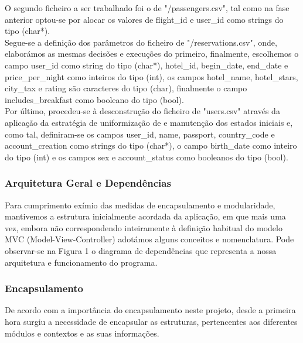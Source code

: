 \documentclass[12pt,a4paper]{article}
\begin{document}
    O segundo ficheiro a ser trabalhado foi o de "/passengers.csv", tal como na fase anterior optou-se por alocar os valores de flight\_id e user\_id como strings do tipo (char*).\\

    Segue-se a definição dos parâmetros do ficheiro de "/reservations.csv", onde, elaborámos as mesmas decisões e execuções do primeiro, finalmente, escolhemos o campo user\_id como string do tipo (char*), hotel\_id, begin\_date, end\_date e price\_per\_night como inteiros do tipo (int), os campos hotel\_name, hotel\_stars, city\_tax e rating são caracteres do tipo (char), finalmente o campo includes\_breakfast como booleano do tipo (bool).\\

    Por último, procedeu-se à desconstrução do ficheiro de "users.csv" através da aplicação da estratégia de uniformização de e manutenção dos estados iniciais e, como tal, definiram-se os campos user\_id, name, passport, country\_code e account\_creation como strings do tipo (char*), o campo birth\_date como inteiro do tipo (int) e os campos sex e account\_status como booleanos do tipo (bool).\\

    \subsubsection{Arquitetura Geral e Dependências}
    \hspace{0,6cm}
    
    Para cumprimento exímio das medidas de encapsulamento e modularidade, mantivemos a estrutura inicialmente acordada da aplicação, em que mais uma vez, embora não correspondendo inteiramente à definição habitual do modelo MVC (Model-View-Controller) adotámos alguns conceitos e nomenclatura. Pode observar-se na Figura 1 o diagrama de dependências que representa a nossa arquitetura e funcionamento do programa.

    \begin{center}
        \label{fig:diagrama}
    \end{center}


    \subsubsection{Encapsulamento}
    \hspace{0.6cm} De acordo com a importância do encapsulamento neste projeto, desde a primeira hora surgiu a necessidade de encapsular as estruturas, pertencentes aos diferentes módulos e contextos e as suas informações. \\
    
\end{document}
